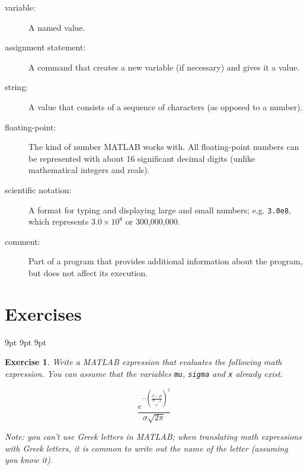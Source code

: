 \documentclass{book}
\begin{document}
\begin{description}
\item[variable:] A named value.

\item[assignment statement:] A command that creates a new variable
(if necessary) and gives it a value.

\item[string:] A value that consists of a sequence of characters (as
opposed to a number).

\item[floating-point:] The kind of number MATLAB works with.  All
floating-point numbers can be represented with about 16 significant
decimal digits (unlike mathematical integers and reals).

\item[scientific notation:] A format for typing and displaying large
and small numbers; e.g. {\tt 3.0e8}, which represents $3.0 \times 10^8$
or 300,000,000.

\item[comment:] Part of a program that provides additional information
about the program, but does not affect its execution.

\end{description}


\section{Exercises}

     {9pt}%
     {9pt}%
     {\itshape}%
     {}%
     {\bfseries}%
     {}%
     {9pt}%
     {}%


\theoremstyle{myex}
\newtheorem{ex}{Exercise}[chapter]

\begin{ex}
Write a MATLAB expression that evaluates the
following math expression.  You can assume that the variables
{\tt mu}, {\tt sigma} and {\tt x} already exist.

\begin{equation}
\frac{e^{- \left( \frac{x-\mu}{\sigma \sqrt{}2} \right) ^2}}
{\sigma \sqrt{2 \pi}}
\end{equation}

Note: you can't use Greek letters in MATLAB; when translating
math expressions with Greek letters, it is common to write out
the name of the letter (assuming you know it).
\end{ex}
\end{document}
